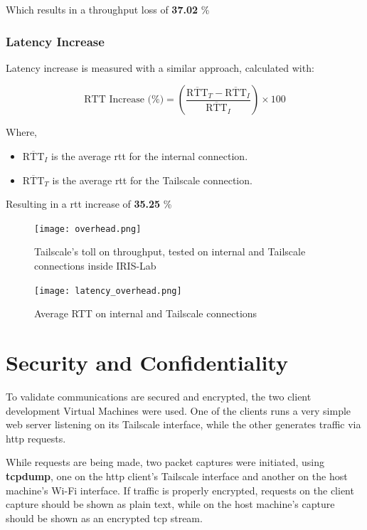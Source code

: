 \documentclass[11pt,twoside,a4paper]{report}
\begin{document}
Which results in a throughput loss of \textbf{37.02} \%


\subsubsection{Latency Increase}

Latency increase is measured with a similar approach, calculated with:

\[
\text{RTT Increase (\%)} = \left( \frac{ \overline{\text{RTT}}_T - \overline{\text{RTT}}_I}{ \overline{\text{RTT}}_I }\right) \times 100
\]

Where,

\begin{itemize}
    \item \( \overline{\text{RTT}}_I \) is the average \ac{rtt} for the internal connection.
    \item \( \overline{\text{RTT}}_T \) is the average \ac{rtt} for the Tailscale connection.
\end{itemize}

Resulting in a \ac{rtt} increase of \textbf{35.25} \%

\begin{figure}[h]
\centering
  \texttt{[image: overhead.png]}
  \caption{Tailscale's toll on throughput, tested on internal and Tailscale connections inside IRIS-Lab}
  \label{fig:overhead}
\end{figure}

\begin{figure}[h]
\centering
  \texttt{[image: latency\_overhead.png]}
  \caption{Average RTT on internal and Tailscale connections}
  \label{fig:latency_overhead}
\end{figure}

\section{Security and Confidentiality}

To validate communications are secured and encrypted, the two client development Virtual Machines were used. One of the clients runs a very simple web server listening on its Tailscale interface, while the other generates traffic via \ac{http} requests.

While requests are being made, two packet captures were initiated, using \textbf{tcpdump}, one on the \ac{http} client's Tailscale interface and another on the host machine's Wi-Fi interface. If traffic is properly encrypted, requests on the client capture should be shown as plain text, while on the host machine's capture should be shown as an encrypted \ac{tcp} stream.
\end{document}
